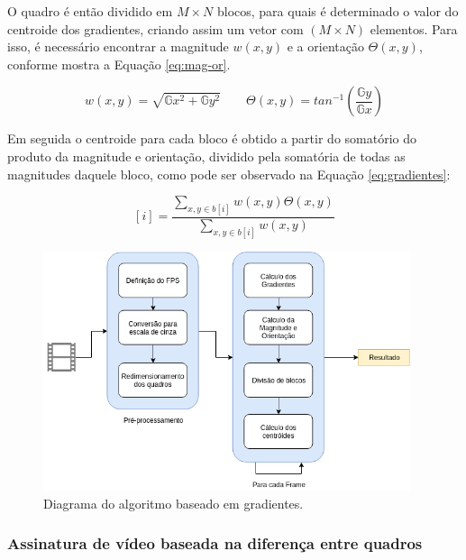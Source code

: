 	O quadro é então dividido em $M\times N$ blocos, para quais é determinado o valor do centroide dos gradientes, criando assim um vetor com $(M \times N)$ elementos. Para isso, é necessário encontrar a magnitude \textit{$w(x,y)$} e a orientação \textit{$\Theta(x,y)$}, conforme mostra a Equação \ref{eq:mag-or}.
    
\begin{equation}
	\label{eq:mag-or}
    w(x,y) = \sqrt{\mathbb{G}x^{2} + \mathbb{G}y^{2}}
\qquad
\Theta(x,y) = tan^{-1}\left (\frac{\mathbb{G}y}{\mathbb{G}x} \right)
\end{equation}
    
    Em seguida o centroide para cada bloco é obtido a partir do somatório do produto da magnitude e orientação, dividido pela somatória de todas as magnitudes daquele bloco, como pode ser observado na Equação \ref{eq:gradientes}:
    
\begin{equation}
	\label{eq:gradientes}
	[i] = \frac{\sum_{x,y \in b[i]} w(x,y)\Theta (x,y)}{\sum_{x,y \in b[i]} w(x,y)}
\end{equation}

 \begin{figure}[h]
      \centering
      \includegraphics[width=0.96\textwidth]{dados/figuras/Gradientes.png}
      \caption{Diagrama do algoritmo baseado em gradientes.}
       	\label{fig:dia_gradiente}
    \end{figure}  
    
%
%

\subsubsection{Assinatura de vídeo baseada na diferença entre quadros}
\label{sec:framediff}

